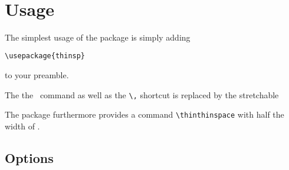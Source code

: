 \documentclass[a4paper,11pt,british]{article}
\def\strthinspace{\texttt{\string\thinspace}}
\begin{document}
\noindent{}\\
\medskip

\section{Usage}
\label{sec:usage}

The simplest usage of the package is simply adding
\begin{lstlisting}
\usepackage{thinsp}
\end{lstlisting}
to your preamble.

The the \strthinspace\ command as well as the \verb+\,+ shortcut is
replaced by the stretchable \strthinspace

The package furthermore provides a command
\verb+\thinthinspace+ with half the width of \strthinspace.

\subsection{Options}
\label{sec:options}
\end{document}

